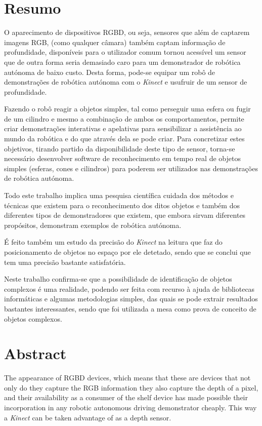 \chapter*{Resumo}

O aparecimento de dispositivos RGBD, ou seja, sensores que além de captarem imagens RGB,
(como qualquer câmara) também captam informação de profundidade, disponíveis para o utilizador
comum tornou acessível um sensor que de outra forma seria demasiado caro
para um demonstrador de robótica autónoma de baixo custo. Desta forma, pode-se equipar um robô de demonstrações de robótica autónoma com o \emph{Kinect} e usufruir de um sensor de profundidade.

Fazendo o robô reagir a objetos simples, tal como perseguir uma esfera ou
fugir de um cilindro e mesmo a combinação de ambos os comportamentos, permite 
criar demonstrações interativas e apelativas para sensibilizar a assistência 
ao mundo da robótica e do que através dela se pode criar. Para concretizar estes objetivos,
tirando partido da disponibilidade deste tipo de sensor, torna-se necessário desenvolver 
software de reconhecimento em tempo real de objetos simples (esferas, cones
e cilindros) para poderem ser utilizados nas demonstrações de robótica
autónoma. 

Todo este trabalho implica uma pesquisa científica cuidada dos métodos e técnicas
que existem para o reconhecimento dos ditos objetos e também dos diferentes tipos
de demonstradores que existem, que embora sirvam diferentes propósitos, demonstram
exemplos de robótica autónoma.

É feito também um estudo da precisão do \emph{Kinect} na leitura que faz do posicionamento de objetos no espaço por ele detetado, sendo que se conclui que tem uma precisão bastante satisfatória.

Neste trabalho confirma-se que a possibilidade de identificação de objetos complexos é uma realidade, podendo ser feita com recurso à ajuda de bibliotecas informáticas e algumas metodologias simples, das quais se pode extrair resultados bastantes interessantes, sendo que foi utilizada a mesa como prova de conceito de objetos complexos.




\chapter*{Abstract}


The appearance of RGBD devices, which means that these are devices that not only do they capture the RGB information they also capture the depth of a pixel, and their availability as a consumer of the shelf device has made possible their incorporation in any robotic autonomous driving demonstrator cheaply. This way a \emph{Kinect} can be taken advantage of as a depth sensor.

